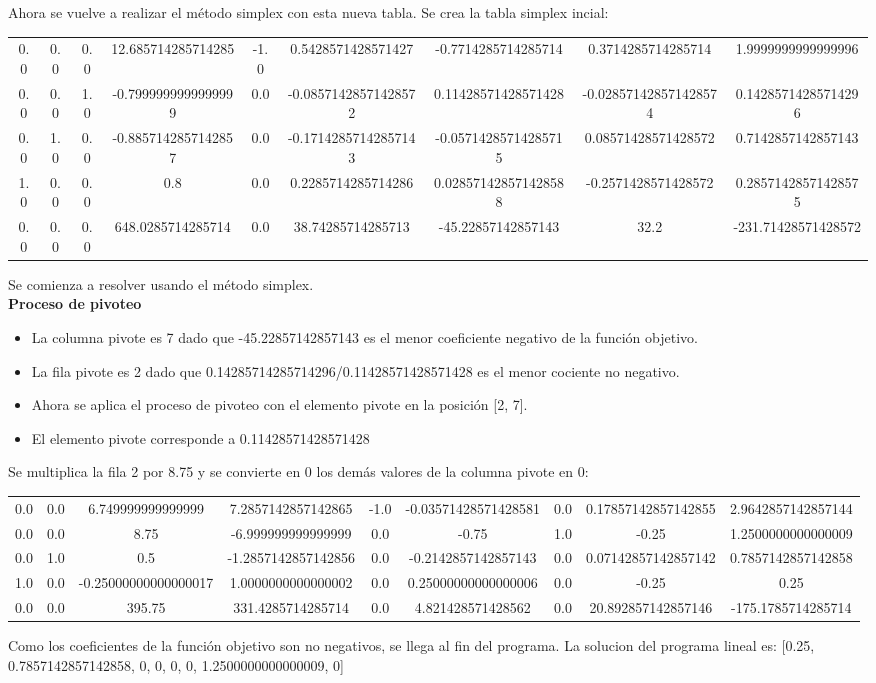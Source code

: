 \documentclass{article} %
\begin{document}
Ahora se vuelve a realizar el método simplex con esta nueva tabla.
Se crea la tabla simplex incial:
\begin{center} 
\begin{tabular}{|cccccccc|c|}\hline
0.0 & 0.0 & 0.0 & 12.685714285714285 & -1.0 & 0.5428571428571427 & -0.7714285714285714 & 0.3714285714285714 & 1.9999999999999996  \\
0.0 & 0.0 & 1.0 & -0.7999999999999999 & 0.0 & -0.08571428571428572 & 0.11428571428571428 & -0.028571428571428574 & 0.14285714285714296  \\
0.0 & 1.0 & 0.0 & -0.8857142857142857 & 0.0 & -0.17142857142857143 & -0.05714285714285715 & 0.08571428571428572 & 0.7142857142857143  \\
1.0 & 0.0 & 0.0 & 0.8 & 0.0 & 0.2285714285714286 & 0.028571428571428588 & -0.2571428571428572 & 0.28571428571428575  \\
\hline
0.0 & 0.0 & 0.0 & 648.0285714285714 & 0.0 & 38.74285714285713 & -45.22857142857143 & 32.2 & -231.71428571428572  \\
\hline
\end{tabular}
\end{center}
Se comienza a resolver usando el método simplex. \\ 
\textbf{Proceso de pivoteo}
\begin{itemize}
\item La columna pivote es 7 dado que -45.22857142857143  es el menor coeficiente negativo de la función objetivo.
\item La fila pivote es 2 dado que 0.14285714285714296/0.11428571428571428 es el menor cociente no negativo.
\item Ahora se aplica el proceso de pivoteo con el elemento pivote en la posición [2, 7].
\item El elemento pivote corresponde a 0.11428571428571428
\end{itemize}
Se multiplica la fila  2 por 8.75  y se convierte en 0 los demás valores de la columna pivote en 0: 
\begin{center}
\begin{tabular}{|cccccccc|c|}\hline
0.0 & 0.0 & 6.749999999999999 & 7.2857142857142865 & -1.0 & -0.03571428571428581 & 0.0 & 0.17857142857142855 & 2.9642857142857144  \\
0.0 & 0.0 & 8.75 & -6.999999999999999 & 0.0 & -0.75 & 1.0 & -0.25 & 1.2500000000000009  \\
0.0 & 1.0 & 0.5 & -1.2857142857142856 & 0.0 & -0.2142857142857143 & 0.0 & 0.07142857142857142 & 0.7857142857142858  \\
1.0 & 0.0 & -0.25000000000000017 & 1.0000000000000002 & 0.0 & 0.25000000000000006 & 0.0 & -0.25 & 0.25  \\
\hline
0.0 & 0.0 & 395.75 & 331.4285714285714 & 0.0 & 4.821428571428562 & 0.0 & 20.892857142857146 & -175.1785714285714  \\
\hline
\end{tabular}
\end{center}
Como los coeficientes de la función objetivo son no negativos, se llega al fin del programa.
La solucion del programa lineal es:
[0.25, 0.7857142857142858, 0, 0, 0, 0, 1.2500000000000009, 0]
\end{document}
